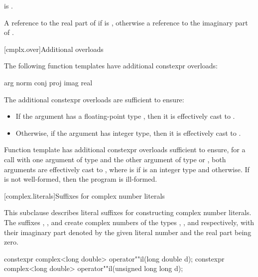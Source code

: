 \begin{itemdescr}
\pnum
\mandates
{} is .

\pnum
\returns
A reference to the real part of  if  is ,
otherwise a reference to the imaginary part of .
\end{itemdescr}

[cmplx.over]{Additional overloads}

\pnum
{}%
%
%
%
%
The following function templates have additional constexpr overloads:
\begin{codeblock}
arg                   norm
conj                  proj
imag                  real
\end{codeblock}

\pnum
{}%
The additional constexpr overloads are sufficient to ensure:
\begin{itemize}
\item
If the argument has a floating-point type ,
then it is effectively cast to .
\item
Otherwise, if the argument has integer type,
then it is effectively cast to .
\end{itemize}

\pnum
{}%
Function template  has additional constexpr overloads sufficient to ensure,
for a call with one argument of type  and
the other argument of type  or ,
both arguments are effectively cast to ,
where  is
 if  is an integer type and  otherwise.
If  is not well-formed,
then the program is ill-formed.

[complex.literals]{Suffixes for complex number literals}

%
\pnum
This subclause describes literal suffixes for constructing complex number literals.
The suffixes , , and  create complex numbers of
the types , , and
 respectively, with their imaginary part denoted by the
given literal number and the real part being zero.

%
\begin{itemdecl}
constexpr complex<long double> operator""il(long double d);
constexpr complex<long double> operator""il(unsigned long long d);
\end{itemdecl}

